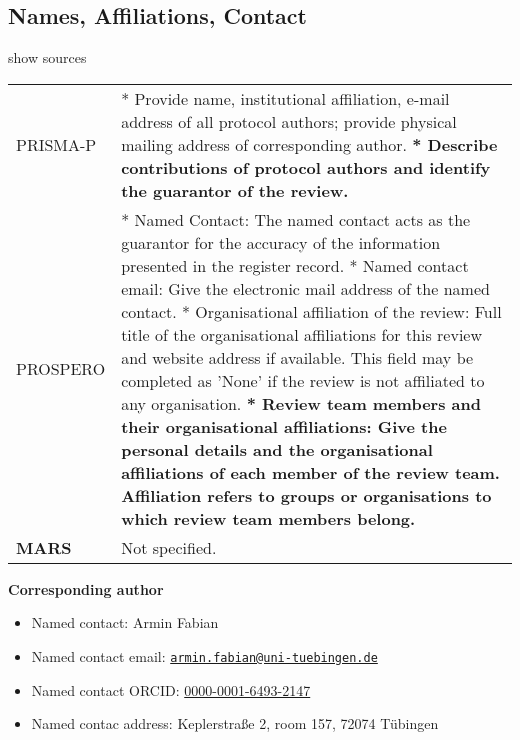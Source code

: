 \documentclass[
]{article}
\providecommand{\tightlist}{%
  \setlength{\itemsep}{0pt}\setlength{\parskip}{0pt}}
\begin{document}
\hypertarget{names-affiliations-contact}{%
\subsection{Names, Affiliations,
Contact}\label{names-affiliations-contact}}

show sources

\hypertarget{nac}{}
\begin{collapse}

\begin{table}[H]
\centering
\begin{tabular}{>{}l|l}
\hline
\cellcolor[HTML]{ececec}{source} & \cellcolor[HTML]{ececec}{description}\\
\hline
PRISMA-P & * Provide name, institutional affiliation, e-mail address of all protocol authors; provide physical mailing address of corresponding author.
\textbf{* Describe contributions of protocol authors and identify the guarantor of the review.}\\
\hline
PROSPERO & * Named Contact: The named contact acts as the guarantor for the accuracy of the information presented in the register record.
* Named contact email: Give the electronic mail address of the named contact.
* Organisational affiliation of the review: Full title of the organisational affiliations for this review and website address if available. This field may be completed as 'None' if the review is not affiliated to any organisation.
\textbf{* Review team members and their organisational affiliations: Give the personal details and the organisational affiliations of each member of the review team. Affiliation refers to groups or organisations to which review team members belong.}\\
\hline
\textbf{MARS} & Not specified.\\
\hline
\end{tabular}
\end{table}

\end{collapse}

\textbf{Corresponding author}

\begin{itemize}
\tightlist
\item
  Named contact: Armin Fabian
\item
  Named contact email:
  \href{mailto:armin.fabian@uni-tuebingen.de}{\nolinkurl{armin.fabian@uni-tuebingen.de}}
\item
  Named contact ORCID:
  \href{https://orcid.org/0000-0001-6493-2147}{0000-0001-6493-2147}
\item
  Named contac address: Keplerstraße 2, room 157, 72074 Tübingen
\end{itemize}
\end{document}
